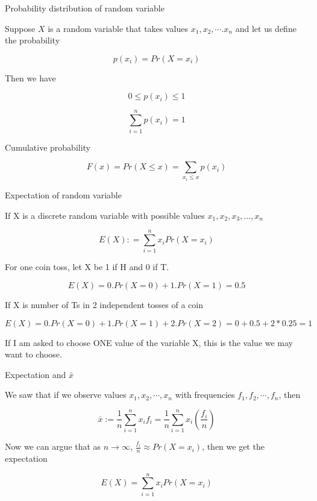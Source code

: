 \documentclass{beamer}\usepackage[]{graphicx}\usepackage[]{color}
\begin{document}
\begin{frame}[fragile]{Probability distribution of random variable \;\;}

Suppose $X$ is a random variable that takes values $x_{1}, x_{2}, \cdots. x_{n}$
and let us define the probability

$$ p(x_{i}) = Pr(X=x_{i}) $$

Then we have

$$ 0 \leq p(x_{i}) \leq 1 $$

$$ \sum_{i=1}^{n} p(x_{i}) = 1 $$

Cumulative probability

$$ F(x) = Pr(X \leq x) = \sum_{x_{i} \leq x} p(x_{i}) $$

\end{frame}


\begin{frame}[fragile]{Expectation of random variable \;\;}

If X is a discrete random variable with possible values $x_1, x_2, x_3, ..., x_n$

$$ E(X) : = \sum_{i=1}^{n} x_{i} Pr(X=x_{i})  $$

For one coin toss, let X be 1 if H and 0 if T.

$$ E(X) = 0. Pr(X=0) + 1. Pr(X=1) = 0.5 $$

If X is number of Ts in 2 independent tosses of a coin

$$ E(X) = 0. Pr(X=0) + 1. Pr(X=1) + 2. Pr(X=2) = 0 + 0.5 + 2*0.25 = 1 $$

If I am asked to choose ONE value of the variable X, this is the value we may want to choose.

\end{frame}


\begin{frame}[fragile]{Expectation and $\bar{x}$ \;\;}

We saw that if we observe values $x_1, x_2, \cdots, x_{n}$ with frequencies $f_{1}, f_{2}, \cdots, f_{n}$, then

$$ \bar{x} := \frac{1}{n} \sum_{i=1}^{n} x_i f_i = \frac{1}{n} \sum_{i=1}^{n} x_{i} \left ( \frac{f_{i}}{n} \right ) $$

Now we can argue that as $n \rightarrow \infty$, $\frac{f_i}{n} \approx Pr(X=x_{i})$,
then we get the expectation

$$ E(X) = \sum_{i=1}^{n} x_{i} Pr (X= x_{i}) $$

\end{frame}
\end{document}
